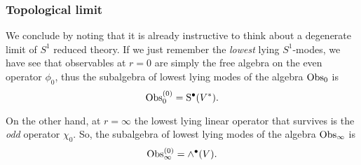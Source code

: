 \documentclass[11pt]{amsart}
\def\brian#1{{\textcolor{blue!65!red}{BRW: {#1}}}}
\begin{document}
%
%
%
%
%

\subsubsection*{Topological limit}

We conclude by noting that it is already instructive to think about a degenerate limit of $S^1$ reduced theory. 
If we just remember the {\em lowest} lying $S^1$-modes, we have see that observables at $r=0$ are simply the free algebra on the even operator $\phi_0$, thus the subalgebra of lowest lying modes of the algebra ${\rm Obs}_0$ is
\[
{\rm Obs}_0^{(0)} = {\rm S}^\bullet(V^*).
\]

On the other hand, at $r=\infty$ the lowest lying linear operator that survives is the {\em odd} operator $\chi_0$.
So, the subalgebra of lowest lying modes of the algebra ${\rm Obs}_\infty$ is
\[
{\rm Obs}_\infty^{(0)} = \wedge^\bullet(V) .
\]
\end{document}
